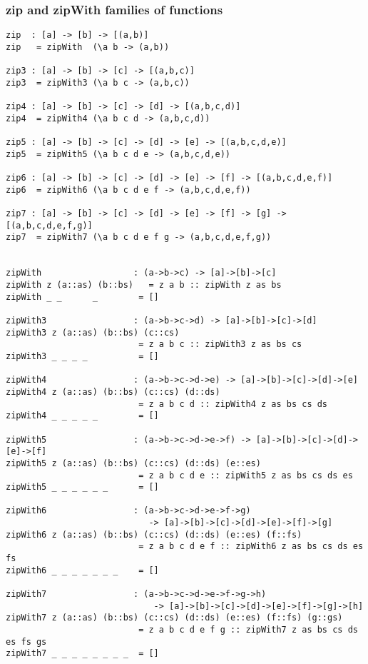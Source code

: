 \subsubsection*{zip and zipWith families of functions}
\begin{verbatim}
zip  : [a] -> [b] -> [(a,b)]
zip   = zipWith  (\a b -> (a,b))

zip3 : [a] -> [b] -> [c] -> [(a,b,c)]
zip3  = zipWith3 (\a b c -> (a,b,c))

zip4 : [a] -> [b] -> [c] -> [d] -> [(a,b,c,d)]
zip4  = zipWith4 (\a b c d -> (a,b,c,d))

zip5 : [a] -> [b] -> [c] -> [d] -> [e] -> [(a,b,c,d,e)]
zip5  = zipWith5 (\a b c d e -> (a,b,c,d,e))

zip6 : [a] -> [b] -> [c] -> [d] -> [e] -> [f] -> [(a,b,c,d,e,f)]
zip6  = zipWith6 (\a b c d e f -> (a,b,c,d,e,f))

zip7 : [a] -> [b] -> [c] -> [d] -> [e] -> [f] -> [g] -> [(a,b,c,d,e,f,g)]
zip7  = zipWith7 (\a b c d e f g -> (a,b,c,d,e,f,g))


zipWith                  : (a->b->c) -> [a]->[b]->[c]
zipWith z (a::as) (b::bs)   = z a b :: zipWith z as bs
zipWith _ _      _        = []

zipWith3                 : (a->b->c->d) -> [a]->[b]->[c]->[d]
zipWith3 z (a::as) (b::bs) (c::cs)
                          = z a b c :: zipWith3 z as bs cs
zipWith3 _ _ _ _          = []

zipWith4                 : (a->b->c->d->e) -> [a]->[b]->[c]->[d]->[e]
zipWith4 z (a::as) (b::bs) (c::cs) (d::ds)
                          = z a b c d :: zipWith4 z as bs cs ds
zipWith4 _ _ _ _ _        = []

zipWith5                 : (a->b->c->d->e->f) -> [a]->[b]->[c]->[d]->[e]->[f]
zipWith5 z (a::as) (b::bs) (c::cs) (d::ds) (e::es)
                          = z a b c d e :: zipWith5 z as bs cs ds es
zipWith5 _ _ _ _ _ _      = []

zipWith6                 : (a->b->c->d->e->f->g)
                            -> [a]->[b]->[c]->[d]->[e]->[f]->[g]
zipWith6 z (a::as) (b::bs) (c::cs) (d::ds) (e::es) (f::fs)
                          = z a b c d e f :: zipWith6 z as bs cs ds es fs
zipWith6 _ _ _ _ _ _ _    = []

zipWith7                 : (a->b->c->d->e->f->g->h)
                             -> [a]->[b]->[c]->[d]->[e]->[f]->[g]->[h]
zipWith7 z (a::as) (b::bs) (c::cs) (d::ds) (e::es) (f::fs) (g::gs)
                          = z a b c d e f g :: zipWith7 z as bs cs ds es fs gs
zipWith7 _ _ _ _ _ _ _ _  = []
\end{verbatim}
